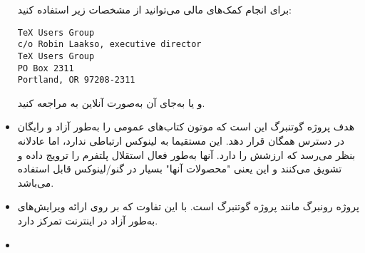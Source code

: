 \begin{itemize}
برای انجام کمک‌های مالی می‌توانید از مشخصات زیر استفاده کنید:
\begin{latin}
\begin{tscreen}
\begin{verbatim}
TeX Users Group
c/o Robin Laakso, executive director
TeX Users Group
PO Box 2311
Portland, OR 97208-2311
\end{verbatim}
\end{tscreen}
\end{latin}

و یا به‌جای آن به‌صورت آنلاین به
مراجعه کنید.

\item
{}

هدف پروژه گوتنبرگ این است که موتون کتاب‌های عمومی را به‌طور آزاد و رایگان
در دسترس همگان قرار دهد. این مستقیما به لینوکس ارتباطی ندارد، اما عادلانه
بنظر می‌رسد که ارزشش را دارد. آنها به‌طور فعال استقلال پلتفرم را ترویج داده
و تشویق می‌کنند و این یعنی "محصولات آنها" بسیار در گنو/لینوکس قابل استفاده می‌باشد.



\item
{}

پروژه رونبرگ مانند پروژه گوتنبرگ است. با این تفاوت که بر روی
ارائه ویرایش‌های
به‌طور آزاد در اینترنت تمرکز دارد.

% 

\item
{}





\end{itemize}
